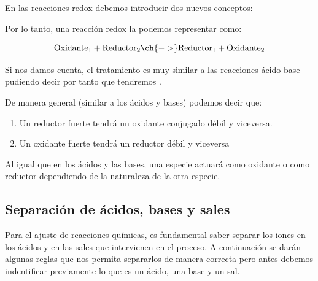     En las reacciones redox debemos introducir dos nuevos conceptos:




    Por lo tanto, una reacción redox la podemos representar como:

    \begin{equation*}
        \text{Oxidante}_1 + \text{Reductor}_2  \ch{->} \text{Reductor}_1 + \text{Oxidante}_2
    \end{equation*}

    Si nos damos cuenta, el tratamiento es muy similar a las reacciones ácido-base pudiendo decir por tanto que tendremos .

    De manera general (similar a los ácidos y bases) podemos decir que:

    \begin{enumerate}[label=\(\bullet\)]
        \item Un reductor fuerte tendrá un oxidante conjugado débil y viceversa.
        \item Un oxidante fuerte tendrá un reductor débil y viceversa
    \end{enumerate}

    Al igual que en los ácidos y las bases, una especie actuará como oxidante o como reductor dependiendo de la naturaleza de la otra especie.

    \subsection{Separación de ácidos, bases y sales}\label{subsec:separacion-de-acido-bases-y-sales}

    Para el ajuste de reacciones químicas, es fundamental saber separar los iones en los ácidos y en las sales que intervienen en el proceso.
    A continuación se darán algunas reglas que nos permita separarlos de manera correcta pero antes debemos indentificar previamente lo que es un ácido, una base y un sal.

